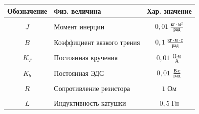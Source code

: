 \begin{center}
\begin{tabular}{|c|l|c|}
\hline
Обозначение
&
Физ. величина
&
Хар. значение\\
\hline
&&\\
$J$
&
Момент инерции
&
$0,\!01\;\frac{\mbox{кг}\cdot\mbox{м}^2}{\mbox{рад}}$\\
\hline
&&\\
$B$
&
Коэффициент вязкого трения
&
$0,\!1\;\frac{\mbox{кг}\cdot\mbox{м}\cdot\mbox{с}}{\mbox{рад}}$
\\
\hline
&&\\
$K_T$
&
Постоянная кручения
&
$0,\!01\;\frac{\mbox{Н}\cdot\mbox{м}}{\mbox{А}}$
\\
\hline
&&\\
$K_b$
&
Постоянная ЭДС
&
$0,\!01\;\frac{\mbox{В}\cdot\mbox{с}}{\mbox{рад}}$
\\
\hline
&&\\
$R$
&
Сопротивление резистора
&
$1\;\mbox{Ом}$
\\
\hline
&&\\
$L$
&
Индуктивность катушки
&
$0,\!5\;\mbox{Гн}$
\\
\hline
\end{tabular}
\end{center}

